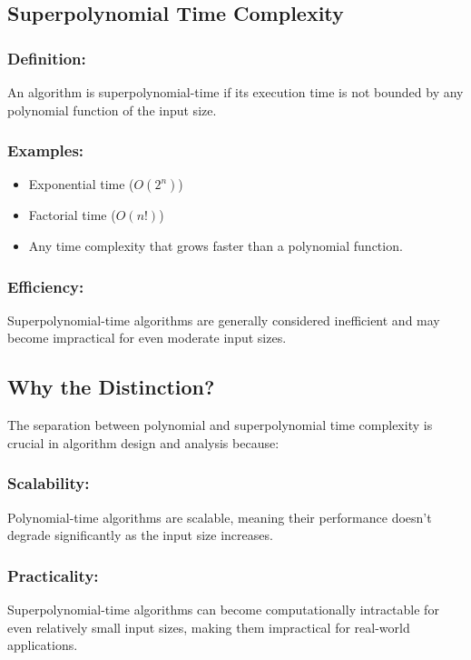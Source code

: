 \documentclass[letter, 12pt]{article}
\begin{document}
    \subsection{Superpolynomial Time Complexity}

    \subsubsection{Definition:}
    An algorithm is superpolynomial-time if its execution time is not bounded by any polynomial function of the input size.

    \subsubsection{Examples:}
    \begin{itemize}
        \item Exponential time ($O(2^n)$)
        \item Factorial time ($O(n!)$)
        \item Any time complexity that grows faster than a polynomial function.
    \end{itemize}

    \subsubsection{Efficiency:}
    Superpolynomial-time algorithms are generally considered inefficient and may become impractical for even moderate input sizes.

    \subsection{Why the Distinction?}
    The separation between polynomial and superpolynomial time complexity is crucial in algorithm design and analysis because:

    \subsubsection{Scalability:}
    Polynomial-time algorithms are scalable, meaning their performance doesn't degrade significantly as the input size increases.

    \subsubsection{Practicality:}
    Superpolynomial-time algorithms can become computationally intractable for even relatively small input sizes, making them impractical for real-world applications.
\end{document}

